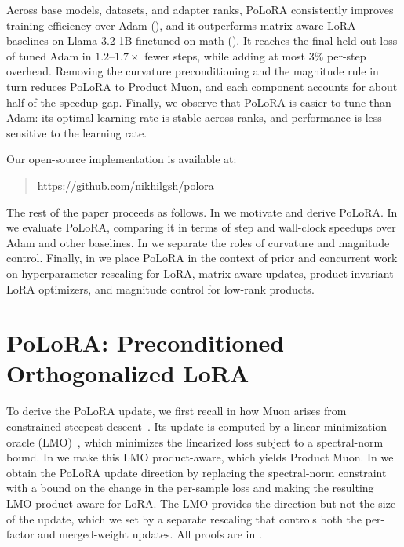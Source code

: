 \documentclass[11pt]{article}
\newcommand{\methodname}{PoLoRA\xspace}
\theoremstyle{plain}
\theoremstyle{definition}
\theoremstyle{remark}
\theoremstyle{definition}
\begin{document}
Across base models, datasets, and adapter ranks, \methodname{} consistently improves training efficiency over Adam (), and it outperforms matrix-aware LoRA baselines on Llama-3.2-1B finetuned on math (). It reaches the final held-out loss of tuned Adam in $1.2$--$1.7\times$ fewer steps, while adding at most 3\% per-step overhead. Removing the curvature preconditioning and the magnitude rule in turn reduces \methodname{} to Product Muon, and each component accounts for about half of the speedup gap. Finally, we observe that \methodname{} is easier to tune than Adam: its optimal learning rate is stable across ranks, and performance is less sensitive to the learning rate.

Our open-source implementation is available at:
\begin{quote}\centering
\url{https://github.com/nikhilgsh/polora}
\end{quote}

The rest of the paper proceeds as follows. In  we motivate and derive \methodname{}.
In  we evaluate \methodname{}, comparing it in terms of step and wall-clock speedups over Adam and other baselines.
In  we separate the roles of curvature and magnitude control.
Finally, in  we place \methodname{} in the context of prior and concurrent work on hyperparameter rescaling for LoRA, matrix-aware updates, product-invariant LoRA optimizers, and magnitude control for low-rank products.







\section{\texorpdfstring{\methodname{}}{PoLoRA}: Preconditioned Orthogonalized LoRA}



\label{sec:method}
To derive the \methodname{} update, we first recall in  how Muon arises from constrained steepest descent~\cite{crawshaw2026exploration}. Its update is computed by a linear minimization oracle (LMO)~\cite{pmlr-v267-pethick25a}, which minimizes the linearized loss subject to a spectral-norm bound. In  we make this LMO product-aware, which yields Product Muon. In  we obtain the \methodname{} update direction by replacing the spectral-norm constraint with a bound on the change in the per-sample loss and making the resulting LMO product-aware for LoRA. The LMO provides the direction but not the size of the update, which we set by a separate rescaling that controls both the per-factor and merged-weight updates. All proofs are in .
\end{document}

